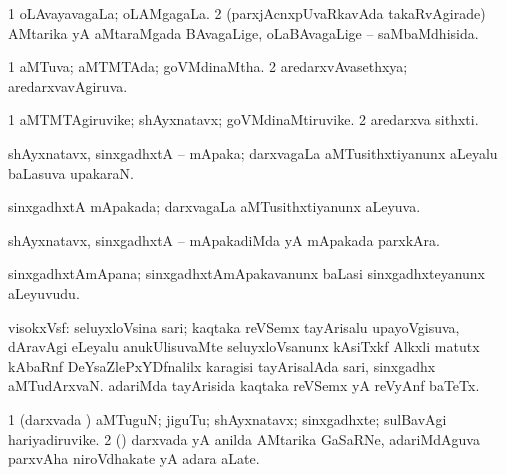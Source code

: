 {{{{{{{{{{\bentry 
{} 
\gl{\gu}
\expl{}
\bmng
\bnum
\num{1} oLAvayavagaLa; oLAMgagaLa. 
\num{2} (parxjAcnxpUvaRkavAda takaRvAgirade) AMtarika yA aMtaraMgada BAvagaLige, oLaBAvagaLige -- saMbaMdhisida. 
\enum
\emng
\eentry

\bentry 
{}
\gl{\nA}
\expl{}
\bmng
\emng
\eentry

\bentry 
{} 
\gl{\gu}
\expl{}
\bmng
\bnum
\num{1} aMTuva; aMTMTAda; goVMdinaMtha. 
\num{2} aredarxvAvasethxya; aredarxvavAgiruva. 
\enum
\emng
\eentry

\bentry
{} 
\gl{\nA}
\expl{}
\bmng
\bnum
\num{1} aMTMTAgiruvike; shAyxnatavx; goVMdinaMtiruvike. 
\num{2} aredarxva sithxti. 
\enum
\emng
\eentry

\bentry
{} 
\gl{\nA}
\expl{}
\bmng
 shAyxnatavx, sinxgadhxtA -- mApaka; darxvagaLa aMTusithxtiyanunx aLeyalu baLasuva upakaraN. 
\emng
\eentry

\bentry 
{} 
\gl{\gu}
\expl{}
\bmng
 sinxgadhxtA mApakada; darxvagaLa aMTusithxtiyanunx aLeyuva. 
\emng
\eentry

\bentry
{} 
\gl{\kirxvi}
\expl{}
\bmng
 shAyxnatavx, sinxgadhxtA -- mApakadiMda yA mApakada parxkAra. 
\emng
\eentry

\bentry
{} 
\gl{\nA}
\expl{}
\bmng
 sinxgadhxtAmApana; sinxgadhxtAmApakavanunx baLasi sinxgadhxteyanunx aLeyuvudu. 
\emng
\eentry

\bentry
{} 
\gl{\nA}
\expl{}
\bmng
 visokxVsf: 
\banum
{} seluyxloVsina sari; kaqtaka reVSemx tayArisalu upayoVgisuva, dAravAgi eLeyalu anukUlisuvaMte seluyxloVsanunx kAsiTxkf Alkxli matutx kAbaRnf DeYsaZlePxYDfnalilx karagisi tayArisalAda sari, sinxgadhx aMTudArxvaN. 
 adariMda tayArisida kaqtaka reVSemx yA reVyAnf baTeTx. 
\eanum
\emng
\eentry


\bentry 
{} 
\gl{\nA}
\expl{}
\bmng
\emng
\eentry

\bentry
{} 
\gl{\nA}
\expl{}
\bmng
\bnum
\num{1} (darxvada \vi) aMTuguN; jiguTu; shAyxnatavx; sinxgadhxte; sulBavAgi hariyadiruvike. 
\num{2} (\Bwvi) darxvada yA anilda AMtarika GaSaRNe, adariMdAguva parxvAha niroVdhakate yA adara aLate. 
\enum
\emng

}}}}}}}}}}
